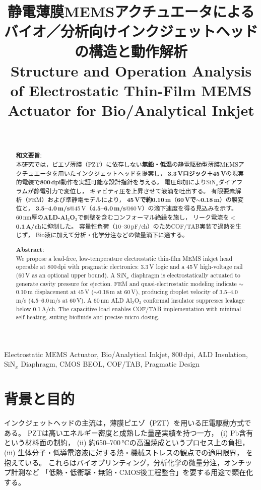 \documentclass[conference]{IEEEtran}
\title{静電薄膜MEMSアクチュエータによるバイオ／分析向けインクジェットヘッドの構造と動作解析\\
\large Structure and Operation Analysis of Electrostatic Thin-Film MEMS Actuator for Bio/Analytical Inkjet }
\author{%
  \IEEEauthorblockN{三溝 真一（Shinichi Samizo)}\\
  \IEEEauthorblockA{独立系半導体研究者（元セイコーエプソン）\\
  Email: \href{mailto:shin3t72@gmail.com}{shin3t72@gmail.com}\\
  GitHub: \url{https://github.com/Samizo-AITL}}%
}
\begin{document}
\maketitle

\begin{abstract}
\textbf{和文要旨}:\\
本研究では，ピエゾ薄膜（PZT）に依存しない\textbf{無鉛・低温}の静電駆動型薄膜MEMSアクチュエータを用いたインクジェットヘッドを提案し，
\textbf{3.3\,Vロジック＋45\,V}の現実的電装で\textbf{800\,dpi}動作を実証可能な設計指針を与える。
電圧印加によりSiN$_x$ダイアフラムが静電引力で変位し，
キャビティ圧を上昇させて液滴を吐出する。
有限要素解析（FEM）および準静電モデルにより，
\textbf{45\,Vで約0.10\,\textmu m}（\textbf{60\,Vで$\sim$0.18\,\textmu m}）の膜変位と，
\textbf{3.5--4.0\,m/s}@45\,V（\textbf{4.5--6.0\,m/s}@60\,V）の滴下速度を得る見込みを示す。
60\,nm厚の\textbf{ALD-Al$_2$O$_3$}で側壁を含むコンフォーマル絶縁を施し，
リーク電流を\textbf{$<$0.1\,\textmu A/ch}に抑制した。
容量性負荷（10--30\,pF/ch）のためCOF/TAB実装で過熱を生じず，
Bio液に加えて分析・化学分注などの微量滴下に適する。

\medskip
\noindent\textbf{Abstract}:\\
We propose a lead-free, low-temperature electrostatic thin-film MEMS inkjet head operable at 800\,dpi with pragmatic electronics: 3.3\,V logic and a 45\,V high-voltage rail (60\,V as an optional upper bound).
A SiN$_x$ diaphragm is electrostatically actuated to generate cavity pressure for ejection.
FEM and quasi-electrostatic modeling indicate $\sim$0.10\,\textmu m displacement at 45\,V ($\sim$0.18\,\textmu m at 60\,V),
producing droplet velocity of 3.5--4.0\,m/s (4.5--6.0\,m/s at 60\,V).
A 60\,nm ALD Al$_2$O$_3$ conformal insulator suppresses leakage below 0.1\,\textmu A/ch.
The capacitive load enables COF/TAB implementation with minimal self-heating,
suiting biofluids and precise micro-dosing.
\end{abstract}

\begin{IEEEkeywords}
Electrostatic MEMS Actuator, Bio/Analytical Inkjet, 800\,dpi, ALD Insulation,
SiN$_x$ Diaphragm, CMOS BEOL, COF/TAB, Pragmatic Design
\end{IEEEkeywords}

\section{背景と目的}
インクジェットヘッドの主流は，薄膜ピエゾ（PZT）を用いる圧電駆動方式である。
PZTは高いエネルギー密度と成熟した量産実績を持つ一方，
(i) Pb含有という材料面の制約，
(ii) 約650--700\,\si{\celsius}の高温焼成というプロセス上の負担，
(iii) 生体分子・低導電溶液に対する熱・機械ストレスの観点での適用限界，
を抱えている。
これらはバイオプリンティング，分析化学の微量分注，オンチップ計測など
「低熱・低衝撃・無鉛・CMOS後工程整合」を要する用途で顕在化する。
\end{document}
